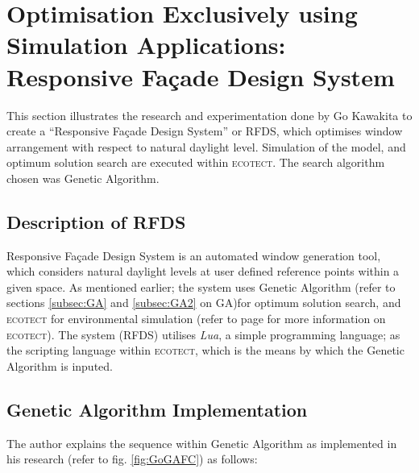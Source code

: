 \clearpage

\section{Optimisation Exclusively using Simulation Applications: Responsive Fa\c{c}ade Design System}
\label{sec:RFDS}

This section illustrates the research and experimentation done by Go Kawakita \cite{kawakita08} to create a ``Responsive Fa\c{c}ade Design System'' or RFDS, which optimises window arrangement with respect to natural daylight level. Simulation of the model, and optimum solution search are executed within \textsc{ecotect}. The search algorithm chosen was Genetic Algorithm.

\subsection{Description of RFDS}

Responsive Fa\c{c}ade Design System is an automated window generation tool, which considers natural daylight levels at user defined reference points within a given space. As mentioned earlier; the system uses Genetic Algorithm (refer to sections \ref{subsec:GA} and \ref{subsec:GA2} on GA)for optimum solution search, and \textsc{ecotect} for environmental simulation (refer to page \pageref{par:ECOTECT} for more information on \textsc{ecotect}). The system (RFDS) utilises \emph{Lua}, a simple programming language; as the scripting language within \textsc{ecotect}, which is the means by which the Genetic Algorithm is inputed.

\subsection{Genetic Algorithm Implementation}

The author explains the sequence within Genetic Algorithm as implemented in his research (refer to fig. \ref{fig:GoGAFC}) as follows:

